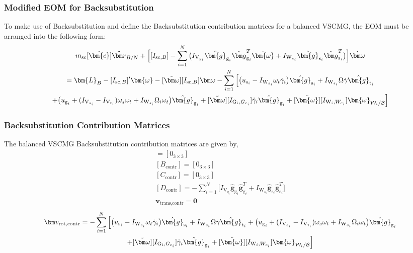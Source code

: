 \subsubsection{Modified EOM for Backsubstitution}
To make use of Backsubstitution and define the Backsubstitution contribution matrices for a balanced VSCMG, the EOM must be arranged into the following form:
\begin{multline}
m_{\text{\text{sc}}}[\tilde{\bm{c}}]\ddot{\bm r}_{B/N} + \Big[ [I_{\text{sc},B}] - \sum\limits_{i=1}^{N}\big(I_{\text{V}_{g_i}}\hat{\bm{g}}_{\text{g}_i}\hat{\bm g}_{\text{g}_i}^T\dot{\bm{\omega}} + I_{\text{W}_{s_i}}\hat{\bm{g}}_{\text{s}_i}\hat{\bm g}_{\text{s}_i}^T\big)\Big]\dot{\bm\omega}
\\
= \bm{L}_B - [I_{\text{sc},B}]'\bm{\omega} - [\tilde{\bm\omega}][I_{\text{sc},B}]\bm\omega
-\sum\limits_{i=1}^{N} \Big[
\big( u_{\text{s}_i}-I_{\text{W}_{s_i}}\omega_t\dot{\gamma}_i \big) \hat{\bm{g}}_{\text{s}_i} + I_{\text{W}_{s_i}}\Omega\dot{\gamma}\hat{\bm{g}}_{\text{t}_i} \\+\big( u_{\text{g}_i} + (I_{\text{V}_{s_i}}-I_{\text{V}_{t_i}})\omega_s\omega_t + I_{\text{W}_{s_i}}\Omega_i\omega_t\big)\hat{\bm{g}}_{\text{g}_i}+ [\tilde{\bm\omega}][I_{\text{G}_i,G_{c_i}}]\dot{\gamma}_i\hat{\bm{g}}_{\text{g}_i} + [\tilde{\bm{\omega}}][I_{\text{W}_i,W_{c_i}}]\bm{\omega}_{\mathcal{W}_i/\cal B}
\Big]
\label{eq:vscmgRotationSimpleBS2_BACKSUBAPP}
\end{multline}

\subsubsection{Backsubstitution Contribution Matrices}
The balanced VSCMG Backsubstitution contribution matrices are given by,
\begin{gather}
[A_\text{contr}] = [0_{3 \times 3}]
\\
[B_\text{contr}] = [0_{3 \times 3}]
\\
[C_\text{contr}] = [0_{3 \times 3}]
\\
[D_\text{contr}] = - \sum\limits_{i=1}^{N}\big[I_{\text{V}_{g_i}}\hat{\bm{g}}_{\text{g}_i}\hat{\bm g}_{\text{g}_i}^T + I_{\text{W}_{s_i}}\hat{\bm{g}}_{\text{s}_i}\hat{\bm g}_{\text{s}_i}^T\big]
\\
\bm v_{\text{trans,contr}} = \bm 0
\end{gather}
\begin{multline}
\bm v_{\text{rot,contr}} =  -\sum\limits_{i=1}^{N} \Big[
\big( u_{\text{s}_i}-I_{\text{W}_{s_i}}\omega_t\dot{\gamma}_i \big) \hat{\bm{g}}_{\text{s}_i} + I_{\text{W}_{s_i}}\Omega\dot{\gamma}\hat{\bm{g}}_{\text{t}_i} +\big( u_{\text{g}_i} + (I_{\text{V}_{s_i}}-I_{\text{V}_{t_i}})\omega_s\omega_t + I_{\text{W}_{s_i}}\Omega_i\omega_t\big)\hat{\bm{g}}_{\text{g}_i}\\+ [\tilde{\bm\omega}][I_{\text{G}_i,G_{c_i}}]\dot{\gamma}_i\hat{\bm{g}}_{\text{g}_i} + [\tilde{\bm{\omega}}][I_{\text{W}_i,W_{c_i}}]\bm{\omega}_{\mathcal{W}_i/\cal B}
\Big]
\end{multline}

